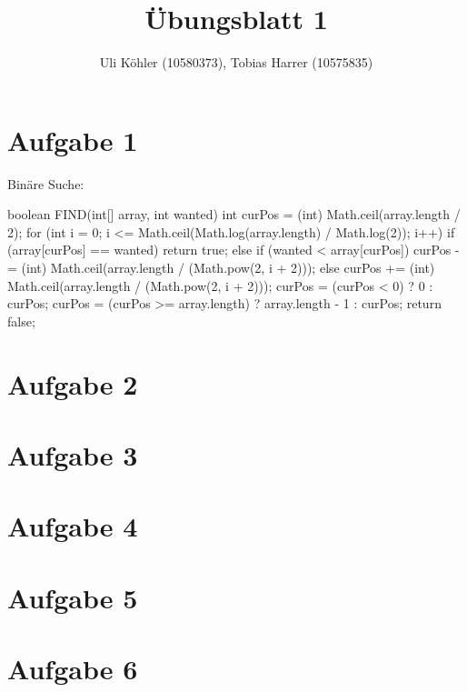 \documentclass[a4paper,10pt]{article}
\title{Übungsblatt 1}
\author{Uli Köhler (10580373), Tobias Harrer (10575835)}
\begin{document}
\maketitle

\section{Aufgabe 1}
Binäre Suche:\newline

boolean FIND(int[] array, int wanted) {
        int curPos = (int) Math.ceil(array.length / 2);
        for (int i = 0; i <= Math.ceil(Math.log(array.length) / Math.log(2)); i++) {
            if (array[curPos] == wanted) {
                return true;
            } else if (wanted < array[curPos]) {
                curPos -= (int) Math.ceil(array.length / (Math.pow(2, i + 2)));
            } else {
                curPos += (int) Math.ceil(array.length / (Math.pow(2, i + 2)));
            }
            curPos = (curPos < 0) ? 0 : curPos;
            curPos = (curPos >= array.length) ? array.length - 1 : curPos;
        }
        return false;
    }

\section{Aufgabe 2}

\section{Aufgabe 3}

\section{Aufgabe 4}

\section{Aufgabe 5}


\section{Aufgabe 6}
\end{document}
